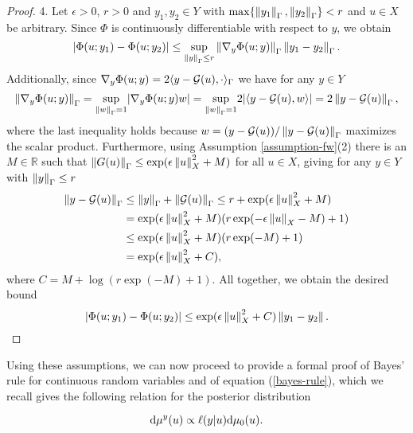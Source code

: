 \begin{proof}
  4. Let $\epsilon > 0$, $r > 0$ and $y_1, y_2 \in Y$ with $\max\{\left\lVert y_1\right\rVert_\Gamma, \left\lVert y_2\right\rVert_\Gamma\} < r$ and $u \in X$ be arbitrary. Since $\Phi$ is continuously differentiable with respect to $y$, we obtain
  \begin{equation*}
    |\Phi(u; y_1) - \Phi(u; y_2)|
    \le \underset{\left\lVert y\right\rVert_\Gamma \le r}{\sup}\left\lVert\nabla_y \Phi(u; y)\right\rVert_\Gamma\left\lVert y_1 - y_2\right\rVert_\Gamma.
  \end{equation*}
  Additionally, since $\nabla_y \Phi(u; y) = 2\langle y - \mathcal{G}(u), \cdot\rangle_\Gamma$ we have for any $y \in Y$
  \begin{equation*}
    \left\lVert\nabla_y \Phi(u; y)\right\rVert_\Gamma
    = \underset{\left\lVert w\right\rVert_\Gamma = 1}{\sup} |\nabla_y \Phi(u; y)w|
      = \underset{\left\lVert w\right\rVert_\Gamma = 1}{\sup} 2|\langle y - \mathcal{G}(u), w\rangle|
      = 2\left\lVert y - \mathcal{G}(u)\right\rVert_\Gamma,
  \end{equation*}
  where the last inequality holds because $w = (y - \mathcal{G}(u)) / \left\lVert y - \mathcal{G}(u)\right\rVert_\Gamma$ maximizes the scalar product. Furthermore, using Assumption \ref{assumption-fw}(2) there is an $M \in \mathbb{R}$ such that $\left\lVert G(u)\right\rVert_\Gamma \le \exp(\epsilon \left\lVert u\right\rVert_X^2 + M)$ for all $u \in X$, giving for any $y \in Y$ with $\left\lVert y\right\rVert_\Gamma \le r$
  \begin{align*}
    \left\lVert y - \mathcal{G}(u)\right\rVert_\Gamma
    &\le \left\lVert y\right\rVert_\Gamma + \left\lVert\mathcal{G}(u)\right\rVert_\Gamma
    \le r + \exp(\epsilon\left\lVert u\right\rVert_X^2 + M)\\
    &= \exp(\epsilon\left\lVert u\right\rVert_X^2 + M)(r \exp(-\epsilon\left\lVert u\right\rVert_X - M) + 1)\\
    &\le \exp(\epsilon\left\lVert u\right\rVert_X^2 + M)(r \exp(-M) + 1)\\
    &= \exp(\epsilon\left\lVert u\right\rVert_X^2 + C),
  \end{align*}
  where $C = M + \log(r \exp(-M) + 1)$. All together, we obtain the desired bound
  \begin{equation*}
    |\Phi(u; y_1) - \Phi(u; y_2)| \le \exp(\epsilon \left\lVert u\right\rVert_X^2 + C)\left\lVert y_1 - y_2\right\rVert.
  \end{equation*}
\end{proof}

Using these assumptions, we can now proceed to provide a formal proof of Bayes' rule for continuous random variables and of equation (\ref{bayes-rule}), which we recall gives the following relation for the posterior distribution

\begin{equation*}
  \text{d}\mu^y(u) \propto \ell(y|u)\text{d}\mu_0(u).
\end{equation*}

